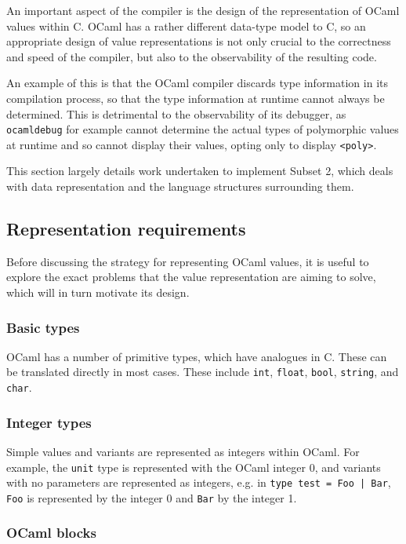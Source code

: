 \documentclass[12pt,a4paper,twoside,openright]{report}
\begin{document}
An important aspect of the compiler is the design of the representation of 
OCaml values within C. OCaml has a rather different data-type model to C, so an 
appropriate design of value representations is not only crucial to the 
correctness and speed of the compiler, but also to the observability of the 
resulting code.

An example of this is that the OCaml compiler discards type information in its 
compilation process, so that the type information at runtime cannot always be 
determined. This is detrimental to the observability of its debugger, as 
\texttt{ocamldebug} for example cannot determine the actual types of 
polymorphic values at runtime and so cannot display their values, opting only 
to display \texttt{<poly>}.

This section largely details work undertaken to implement Subset 2, which deals 
with data representation and the language structures surrounding them.

\subsection{Representation requirements}

Before discussing the strategy for representing OCaml values, it is useful to 
explore the exact problems that the value representation are aiming to solve, 
which will in turn motivate its design.

\subsubsection{Basic types}

OCaml has a number of primitive types, which have analogues in C. These can be 
translated directly in most cases. These include \texttt{int}, \texttt{float}, 
\texttt{bool}, \texttt{string}, and \texttt{char}.

\subsubsection{Integer types}

Simple values and variants are represented as integers within OCaml. For 
example, the \texttt{unit} type is represented with the OCaml integer 0, and 
variants with no parameters are represented as integers, e.g. in \texttt{type 
test = Foo | Bar}, \texttt{Foo} is represented by the integer 0 and 
\texttt{Bar} by the integer 1.

\subsubsection{OCaml blocks}
\end{document}
